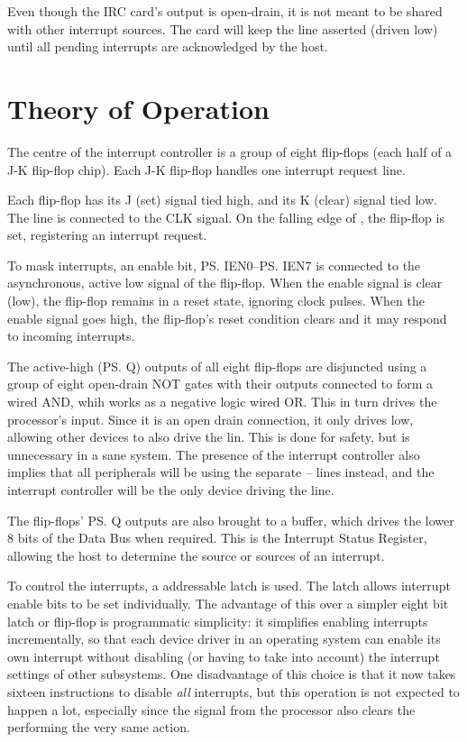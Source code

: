 Even though the IRC card's output is open-drain, it is not meant to be shared
with other interrupt sources. The card will keep the  line asserted
(driven low) until all pending interrupts are acknowledged by the host.

\section{Theory of Operation}

The centre of the interrupt controller is a group of eight flip-flops (each
half of a  J-K flip-flop chip). Each J-K flip-flop handles one
interrupt request line.

Each flip-flop has its J (set) signal tied high, and its K (clear) signal tied
low. The  line is connected to the CLK signal. On the falling edge of
, the flip-flop is set, registering an interrupt request.

To mask interrupts, an enable bit, \ps{IEN0}–\ps{IEN7} is connected to the
asynchronous, active low  signal of the flip-flop. When the enable
signal is clear (low), the flip-flop remains in a reset state, ignoring clock
pulses. When the enable signal goes high, the flip-flop's reset condition
clears and it may respond to incoming interrupts.

The active-high (\ps{Q}) outputs of all eight flip-flops are disjuncted using a
group of eight open-drain NOT gates with their outputs connected to form a
wired AND, whih works as a negative logic wired OR. This in turn drives the
processor's  input. Since it is an open drain connection, it only
drives low, allowing other devices to also drive the  lin. This is done
for safety, but is unnecessary in a sane system. The presence of the interrupt
controller also implies that all peripherals will be using the separate
– lines instead, and the interrupt controller will be the
only device driving the  line.

The flip-flops' \ps{Q} outputs are also brought to a  buffer, which
drives the lower 8 bits of the Data Bus when required. This is the Interrupt
Status Register, allowing the host to determine the source or sources of an
interrupt.

To control the interrupts, a  addressable latch is used. The latch
allows interrupt enable bits to be set individually. The advantage of this over
a simpler eight bit latch or flip-flop is programmatic simplicity: it
simplifies enabling interrupts incrementally, so that each device driver in an
operating system can enable its own interrupt without disabling (or having to
take into account) the interrupt settings of other subsystems. One disadvantage
of this choice is that it now takes sixteen instructions to disable {\em all\/}
interrupts, but this operation is not expected to happen a lot, especially
since the  signal from the processor also clears the 
performing the very same action.

